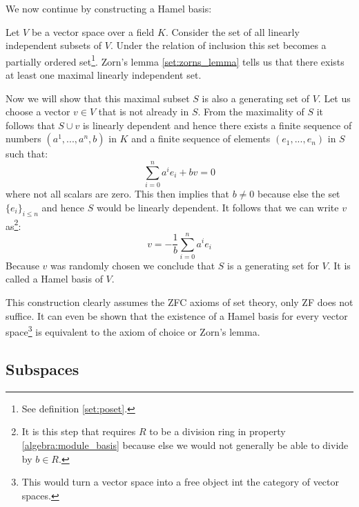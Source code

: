 	We now continue by constructing a Hamel basis:
	\begin{construct}\label{linalgebra:hamel_basis}
		Let $V$ be a vector space over a field $K$. Consider the set of all linearly independent subsets of $V$. Under the relation of inclusion this set becomes a partially ordered set\footnote{See definition \ref{set:poset}.}. Zorn's lemma \ref{set:zorns_lemma} tells us that there exists at least one maximal linearly independent set.
		
		Now we will show that this maximal subset $S$ is also a generating set of $V$. Let us choose a vector $v\in V$ that is not already in $S$. From the maximality of $S$ it follows that $S\cup v$ is linearly dependent and hence there exists a finite sequence of numbers $(a^1, ..., a^n, b)$ in $K$ and a finite sequence of elements $(e_1, ..., e_n)$ in $S$ such that:
		\begin{equation}
			\sum_{i=0}^n a^ie_i + bv = 0
		\end{equation}
		where not all scalars are zero. This then implies that $b\neq0$ because else the set $\{e_i\}_{i\leq n}$ and hence $S$ would be linearly dependent. It follows that we can write $v$ as\footnote{It is this step that requires $R$ to be a division ring in property \ref{algebra:module_basis} because else we would not generally be able to divide by $b\in R$.}:
		\begin{equation}
			v = -\frac{1}{b}\sum_{i=0}^na^ie_i
		\end{equation}
		Because $v$ was randomly chosen we conclude that $S$ is a generating set for $V$. It is called a Hamel basis of $V$.
	\end{construct}
	\begin{remark*}
		This construction clearly assumes the ZFC axioms of set theory, only ZF does not suffice. It can even be shown that the existence of a Hamel basis for every vector space\footnote{This would turn a vector space into a free object int the category of vector spaces.} is equivalent to the axiom of choice or Zorn's lemma.
	\end{remark*}
    
\subsection{Subspaces}


